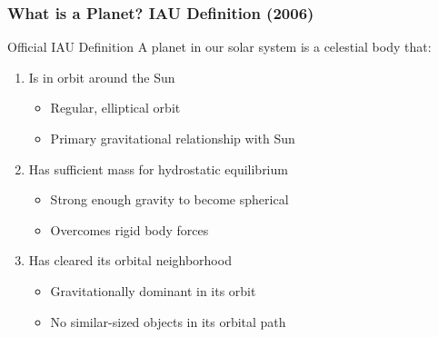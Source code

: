 \documentclass{beamer}
\begin{document}
\begin{frame}
\frametitle{What is a Planet? IAU Definition (2006)}

\begin{block}{Official IAU Definition}
A planet in our solar system is a celestial body that:
\end{block}

\begin{enumerate}
    \item Is in orbit around the Sun
    \begin{itemize}
        \item Regular, elliptical orbit
        \item Primary gravitational relationship with Sun
    \end{itemize}
    
    \item Has sufficient mass for hydrostatic equilibrium
    \begin{itemize}
        \item Strong enough gravity to become spherical
        \item Overcomes rigid body forces
    \end{itemize}
    
    \item Has cleared its orbital neighborhood
    \begin{itemize}
        \item Gravitationally dominant in its orbit
        \item No similar-sized objects in its orbital path
    \end{itemize}
\end{enumerate}
\end{frame}
\end{document}
